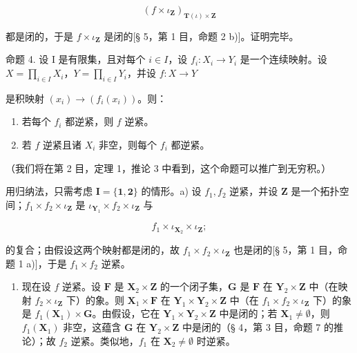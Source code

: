 \[
(f \times \iota_ {\mathbf {Z}}) _ {\mathbf {T} (\iota) \times \mathbf {Z}}
\]

都是闭的，于是 \(f \times \iota_{\mathbf{Z}}\) 是闭的{[}§ 5，第 1 目，命题 2 b){]}。证明完毕。

命题 4. 设 I 是有限集，且对每个 \(i \in I\)，设 \(f_i: X_i \to Y_i\) 是一个连续映射。设 \(X = \prod_{i \in I} X_i\)，\(Y = \prod_{i \in I} Y_i\)，并设 \(f: X \to Y\)

是积映射 \((x_{i})\to (f_{i}(x_{i}))\)。则：

\begin{enumerate}
\def\labelenumi{\alph{enumi})}
\item
  若每个 \(f_i\) 都逆紧，则 \(f\) 逆紧。
\item
  若 \(f\) 逆紧且诸 \(X_i\) 非空，则每个 \(f_i\) 都逆紧。
\end{enumerate}

（我们将在第 2 目，定理 1，推论 3 中看到，这个命题可以推广到无穷积。）

用归纳法，只需考虑 \(\mathbf{I} = \{\mathbf{1},\mathbf{2}\}\) 的情形。a) 设 \(f_{1}, f_{2}\) 逆紧，并设 \(\mathbf{Z}\) 是一个拓扑空间；\(f_{1} \times f_{2} \times \iota_{\mathbf{Z}}\) 是 \(\iota_{\mathbf{Y}_1} \times f_2 \times \iota_{\mathbf{Z}}\) 与

\[
f _ {1} \times \iota_ {\mathbf {X} _ {2}} \times \iota_ {\mathbf {Z}};
\]

的复合；由假设这两个映射都是闭的，故 \(f_{1} \times f_{2} \times \iota_{\mathbf{Z}}\) 也是闭的{[}§ 5，第 1 目，命题 1 a){]}，于是 \(f_{1} \times f_{2}\) 逆紧。

\begin{enumerate}
\def\labelenumi{\alph{enumi})}
\setcounter{enumi}{1}
\tightlist
\item
  现在设 \(f\) 逆紧。设 \(\mathbf{F}\) 是 \(\mathbf{X}_2 \times \mathbf{Z}\) 的一个闭子集，\(\mathbf{G}\) 是 \(\mathbf{F}\) 在 \(\mathbf{Y}_2 \times \mathbf{Z}\) 中（在映射 \(f_2 \times \iota_{\mathbf{Z}}\) 下）的象。则 \(\mathbf{X}_1 \times \mathbf{F}\) 在 \(\mathbf{Y}_1 \times \mathbf{Y}_2 \times \mathbf{Z}\) 中（在 \(f_1 \times f_2 \times \iota_{\mathbf{Z}}\) 下）的象是 \(f_1(\mathbf{X}_1) \times \mathbf{G}\)。由假设，它在 \(\mathbf{Y}_1 \times \mathbf{Y}_2 \times \mathbf{Z}\) 中是闭的；若 \(\mathbf{X}_1 \neq \emptyset\)，则 \(f_1(\mathbf{X}_1)\) 非空，这蕴含 \(\mathbf{G}\) 在 \(\mathbf{Y}_2 \times \mathbf{Z}\) 中是闭的（§ 4，第 3 目，命题 7 的推论）；故 \(f_2\) 逆紧。类似地，\(f_1\) 在 \(\mathbf{X}_2 \neq \emptyset\) 时逆紧。
\end{enumerate}


